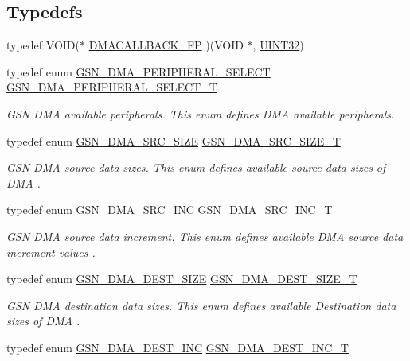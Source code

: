 \subsection*{Typedefs}
\begin{DoxyCompactItemize}
\item 
typedef VOID($\ast$ \hyperlink{a00484_a74d23c3cb3acf00134600795aef55b6e}{DMACALLBACK\_\-FP} )(VOID $\ast$, \hyperlink{a00660_gae1e6edbbc26d6fbc71a90190d0266018}{UINT32})
\item 
typedef enum \hyperlink{a00645_ga6b06d19717ade6dfd815a84e83d2388c}{GSN\_\-DMA\_\-PERIPHERAL\_\-SELECT} \hyperlink{a00645_gab17cf1a2935d52f5490128aeddd1eb07}{GSN\_\-DMA\_\-PERIPHERAL\_\-SELECT\_\-T}
\begin{DoxyCompactList}\small\item\em GSN DMA available peripherals. This enum defines DMA available peripherals. \end{DoxyCompactList}\item 
typedef enum \hyperlink{a00645_ga5ae8eaac9f901eb2607d04c46b8141e9}{GSN\_\-DMA\_\-SRC\_\-SIZE} \hyperlink{a00645_ga30dffcfe8e6fc270f93048d90cd440ec}{GSN\_\-DMA\_\-SRC\_\-SIZE\_\-T}
\begin{DoxyCompactList}\small\item\em GSN DMA source data sizes. This enum defines available source data sizes of DMA . \end{DoxyCompactList}\item 
typedef enum \hyperlink{a00645_ga592093c11bfd36ebbe08e1446e26f37a}{GSN\_\-DMA\_\-SRC\_\-INC} \hyperlink{a00645_gadfad5571e188cca605e051802c24ada0}{GSN\_\-DMA\_\-SRC\_\-INC\_\-T}
\begin{DoxyCompactList}\small\item\em GSN DMA source data increment. This enum defines available DMA source data increment values . \end{DoxyCompactList}\item 
typedef enum \hyperlink{a00645_gab66304fcaa89e7d7dd7d514eb086c56c}{GSN\_\-DMA\_\-DEST\_\-SIZE} \hyperlink{a00645_ga911fde9b2a20ed7759a9d2a8849e34f4}{GSN\_\-DMA\_\-DEST\_\-SIZE\_\-T}
\begin{DoxyCompactList}\small\item\em GSN DMA destination data sizes. This enum defines available Destination data sizes of DMA . \end{DoxyCompactList}\item 
typedef enum \hyperlink{a00645_gaeec51ec6ddb024d9e8bb0c011cb167ef}{GSN\_\-DMA\_\-DEST\_\-INC} \hyperlink{a00645_gad729aa817bfd135b589e7c5d589c6c24}{GSN\_\-DMA\_\-DEST\_\-INC\_\-T}

\end{DoxyCompactItemize}
